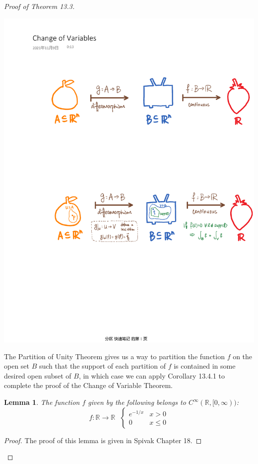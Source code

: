 \documentclass[11pt,oneside]{book}
\theoremstyle{break}
\theoremstyle{break}
\newtheorem{lem}{Lemma}[thm]
\newcommand{\R}{\mathbb{R}}
\begin{document}
\begin{proof}[Proof of Theorem 13.3]
\begin{center}
\includegraphics[scale=0.69]{cor13.4.pdf}
\end{center}

The Partition of Unity Theorem gives us a way to partition the function $f$ on the open set $B$ such that the support of each partition of $f$ is contained in some desired open subset of $B$, in which case we can apply Corollary 13.4.1 to complete the proof of the Change of Variable Theorem.

\begin{lem}
\setlength{\leftskip}{1cm}The function $f$ given by the following belongs to $C^\infty (\R,[0,\infty))$: $$f:\R \to \R \ \ \ \begin{cases}e^{-1/x} &x>0\\0&x\leq 0  \end{cases}$$
\end{lem}
\begin{proof}
\setlength{\leftskip}{1cm}The proof of this lemma is given in Spivak Chapter 18.
\end{proof}


\end{proof}
\end{document}
